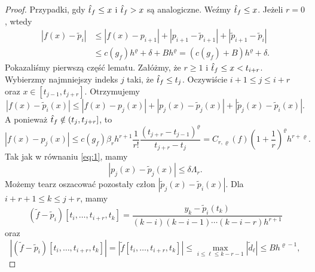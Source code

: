 \documentclass[oik, pdftex, robocza, man]{mgrwms}
\begin{document}
    \begin{proof}
        Przypadki, gdy $\hat{t}_{f} \leq x$ i $\hat{t}_{f} > x$ są analogiczne. Weźmy $\hat{t}_{f} \leq x$. Jeżeli $r=0$, wtedy
        \begin{equation*}
            \begin{aligned}
                \left|f(x)-\tilde{p}_{i}\right| & \leq\left|f(x)-p_{i+1}\right|+\left|p_{i+1}-\tilde{p}_{i+1}\right|+\left|\tilde{p}_{i+1}-\tilde{p}_{i}\right| \\
                & \leq c\left(g_{f}\right) h^{\varrho}+\delta+B h^{\varrho}=\left(c\left(g_{f}\right)+B\right) h^{\varrho}+\delta.
            \end{aligned}    
        \end{equation*}
        Pokazaliśmy pierwszą część lematu.
        Załóżmy, że $r \geq 1$ i $\hat{t}_{f} \leq x<t_{i+r}$. Wybierzmy najmniejszy indeks $j$ taki, że $\hat{t}_{f} \leq t_{j}$. Oczywiście $i+1 \leq j \leq i+r$ oraz $x \in\left[t_{j-1}, t_{j+r}\right]$. 
        Otrzymujemy
        \begin{equation} \label{eq:6}
            \left|f(x)-\tilde{p}_{i}(x)\right| \leq\left|f(x)-p_{j}(x)\right|+\left|p_{j}(x)-\tilde{p}_{j}(x)\right|+\left|\tilde{p}_{j}(x)-\tilde{p}_{i}(x)\right|.
        \end{equation}
        A ponieważ $\hat{t}_{f} \notin\left(t_{j}, t_{j+r}\right]$, to
        \begin{equation*}
            \left|f(x)-p_{j}(x)\right| \leq c\left(g_{f}\right) \beta_{r} h^{r+1} \frac{1}{r !} \frac{\left(t_{j+r}-t_{j-1}\right)^{\varrho}}{t_{j+r}-t_{j}}=C_{r, \varrho}(f)\left(1+\frac{1}{r}\right)^{\varrho} h^{r+\varrho}.
        \end{equation*}
        Tak jak w równaniu \eqref{eq:1}, mamy
        \begin{equation*}
            \left|p_{j}(x)-\tilde{p}_{j}(x)\right| \leq \delta \Lambda_{r}.
        \end{equation*}
        Możemy tearz oszacować pozostały człon $\left|\tilde{p}_{j}(x)-\tilde{p}_{i}(x)\right|$. Dla $i+r+1 \leq k \leq j+r$, mamy
        \begin{equation} \label{eq:3}
            \left(\tilde{f}-\tilde{p}_{i}\right)\left[t_{i}, \ldots, t_{i+r}, t_{k}\right]=\frac{y_{k}-\tilde{p}_{i}\left(t_{k}\right)}{(k-i)(k-i-1) \cdots(k-i-r) h^{r+1}}
        \end{equation}
        oraz
        \begin{equation} \label{eq:4}
            \left|\left(\tilde{f}-\tilde{p}_{i}\right)\left[t_{i}, \ldots, t_{i+r}, t_{k}\right]\right|=\left|\tilde{f}\left[t_{i}, \ldots, t_{i+r}, t_{k}\right]\right| \leq \max_{i \leq \ell \leq k-r-1}\left|\tilde{d}_{\ell}\right| \leq B h^{\varrho-1},

\end{equation}
\end{proof}
\end{document}
